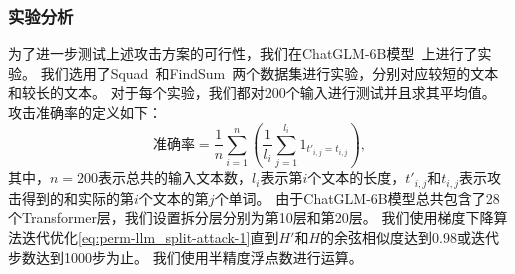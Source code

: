 \subsubsection{实验分析}
为了进一步测试上述攻击方案的可行性，我们在ChatGLM-6B模型~\cite{zeng_2022_glm130b}上进行了实验。
%
我们选用了Squad~\cite{2016_squad}和FindSum~\cite{2022_findsum}两个数据集进行实验，分别对应较短的文本和较长的文本。
%
对于每个实验，我们都对200个输入进行测试并且求其平均值。
%
攻击准确率的定义如下：
\begin{equation}
    \text{准确率} = \dfrac{1}{n} \sum_{i=1}^n \left( \dfrac{1}{l_i} \sum_{j=1}^{l_i} 1_{t'_{i,j} = t_{i,j}} \right),
\end{equation}
其中，$n = 200$表示总共的输入文本数，$l_i$表示第$i$个文本的长度，$t'_{i,j}$和$t_{i,j}$表示攻击得到的和实际的第$i$个文本的第$j$个单词。
%
由于ChatGLM-6B模型总共包含了28个Transformer层，我们设置拆分层分别为第10层和第20层。
%
我们使用梯度下降算法迭代优化\autoref{eq:perm-llm_split-attack-1}直到$H'$和$H$的余弦相似度达到0.98或迭代步数达到1000步为止。
%
我们使用半精度浮点数进行运算。

